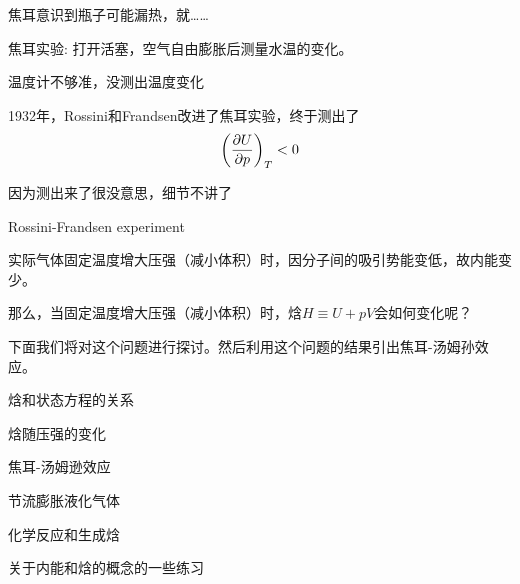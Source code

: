 \documentclass[CJK]{beamer}
\begin{document}
\begin{frame}
\bch
焦耳意识到瓶子可能漏热，就……

焦耳实验: 打开活塞，空气自由膨胀后测量水温的变化。
\emini
{}
\emini

\ech
\end{frame}


\begin{frame}
\bch


温度计不够准，没测出温度变化 
\ech
\end{frame}


\begin{frame}
\bch
1932年，Rossini和Frandsen改进了焦耳实验，终于测出了
$$\left(\frac{\partial U}{\partial p}\right)_{T} < 0 $$

\skiplines

因为测出来了很没意思，细节不讲了
\ech
\end{frame}

\begin{frame}
\bch
{}
\emini
{}
Rossini-Frandsen experiment

\emini

\ech
\end{frame}

\begin{frame}
\bch
实际气体固定温度增大压强（减小体积）时，因分子间的吸引势能变低，故内能变少。


那么，当固定温度增大压强（减小体积）时，焓$H\equiv U + pV$会如何变化呢？

\skiplines

下面我们将对这个问题进行探讨。然后利用这个问题的结果引出焦耳-汤姆孙效应。
\ech
\end{frame}


\begin{frame}
\bch
\bitem
\item{焓和状态方程的关系}
\item{焓随压强的变化}
\item{焦耳-汤姆逊效应}
\item{节流膨胀液化气体}
\item{化学反应和生成焓}
\item{关于内能和焓的概念的一些练习}
\eitem
\ech
\end{frame}
\end{document}
